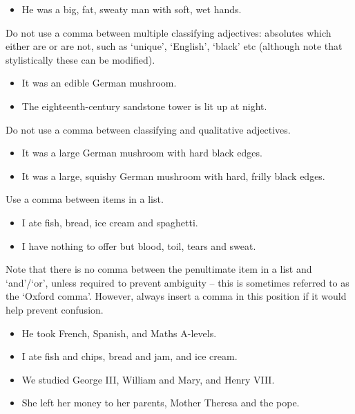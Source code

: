 \documentclass[11pt,a4paper]{book}
\newcommand{\xmark}{{\color{cadmiumred}\ding{54}}}%
\newcommand{\cmark}{{\color{green(html/cssgreen)}\checkmark}}%
\begin{document}
		{\firasans \begin{mdframed}[backgroundcolor=aliceblue] \begin{itemize}[label=\cmark]
			\item He was a big, fat, sweaty man with soft, wet hands.
		\end{itemize} \end{mdframed} }
		Do not use a comma between multiple classifying adjectives: absolutes which either are or are not, such as `unique', `English', `black' etc (although note that stylistically these can be modified).
		{\firasans \begin{mdframed}[backgroundcolor=aliceblue] \begin{itemize}[label=\cmark]
			\item It was an edible German mushroom.
			\item The eighteenth-century sandstone tower is lit up at night.
		\end{itemize} \end{mdframed} }
		Do not use a comma between classifying and qualitative adjectives.
		{\firasans \begin{mdframed}[backgroundcolor=aliceblue] \begin{itemize}[label=\cmark]
			\item It was a large German mushroom with hard black edges.
			\item It was a large, squishy German mushroom with hard, frilly black edges.
		\end{itemize} \end{mdframed} }
		Use a comma between items in a list.
		{\firasans \begin{mdframed}[backgroundcolor=aliceblue] \begin{itemize}[label=\cmark]
			\item I ate fish, bread, ice cream and spaghetti.
			\item I have nothing to offer but blood, toil, tears and sweat.
		\end{itemize} \end{mdframed} }
		Note that there is no comma between the penultimate item in a list and `and'/`or', unless required to prevent ambiguity -- this is sometimes referred to as the `Oxford comma'. However, always insert a comma in this position if it would help prevent confusion.
		{\firasans \begin{mdframed}[backgroundcolor=aliceblue] \begin{itemize}[label=\cmark]
			\item[\xmark] He took French, Spanish, and Maths A-levels.
			\item I ate fish and chips, bread and jam, and ice cream.
			\item We studied George III, William and Mary, and Henry VIII.
			\item[\xmark] She left her money to her parents, Mother Theresa and the pope.
		\end{itemize} \end{mdframed} }
\end{document}
